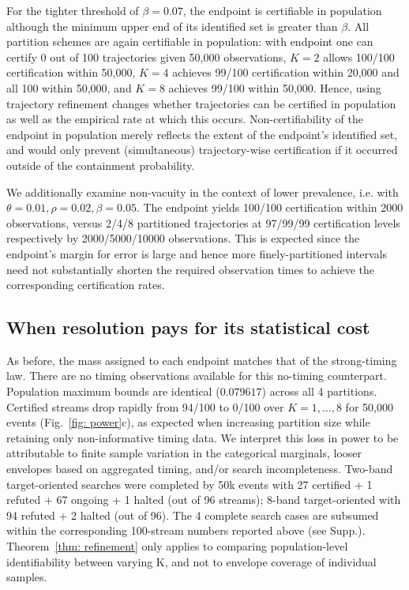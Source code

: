 \begin{table}[!htbp]\centering
\caption{Selected strong-timing certification results at $\rho=0.08$. Counts refer to ever certifying by the stated horizon. Intervals quantify Monte Carlo certification probability across 100 streams, separately for each row. The full checkpoint curves and matched control are in Figure~\ref{fig:power}.}\label{tab:power}

\end{table}
\FloatBarrier

For the tighter threshold of $\beta=0.07$, the endpoint is certifiable in population although the minimum upper end of its identified set is greater than $\beta$. All partition schemes are again certifiable in population: with endpoint one can certify 0 out of 100 trajectories given 50,000 observations, $K=2$ allows 100/100 certification within 50,000, $K=4$ achieves 99/100 certification within 20,000 and all 100 within 50,000, and $K=8$ achieves 99/100 within 50,000. Hence, using trajectory refinement changes whether trajectories can be certified in population as well as the empirical rate at which this occurs. Non-certifiability of the endpoint in population merely reflects the extent of the endpoint's identified set, and would only prevent (simultaneous) trajectory-wise certification if it occurred outside of the containment probability.

We additionally examine non-vacuity in the context of lower prevalence, i.e. with $\theta=0.01,\rho=0.02,\beta=0.05$. The endpoint yields 100/100 certification within 2000 observations, versus 2/4/8 partitioned trajectories at 97/99/99 certification levels respectively by 2000/5000/10000 observations. This is expected since the endpoint's margin for error is large and hence more finely-partitioned intervals need not substantially shorten the required observation times to achieve the corresponding certification rates.

\subsection{When resolution pays for its statistical cost}
As before, the mass assigned to each endpoint matches that of the strong-timing law. There are no timing observations available for this no-timing counterpart. Population maximum bounds are identical ($0.079617$) across all 4 partitions. Certified streams drop rapidly from 94/100 to 0/100 over $K=1,...,8$ for 50,000 events (Fig.~\ref{fig: power}c), as expected when increasing partition size while retaining only non-informative timing data. We interpret this loss in power to be attributable to finite sample variation in the categorical marginals, looser envelopes based on aggregated timing, and/or search incompleteness. Two-band target-oriented searches were completed by 50k events with 27 certified + 1 refuted + 67 ongoing + 1 halted (out of 96 streams); 8-band target-oriented with 94 refuted + 2 halted (out of 96). The 4 complete search cases are subsumed within the corresponding 100-stream numbers reported above (see Supp.). Theorem~\ref{thm: refinement} only applies to comparing population-level identifiability between varying K, and not to envelope coverage of individual samples.

